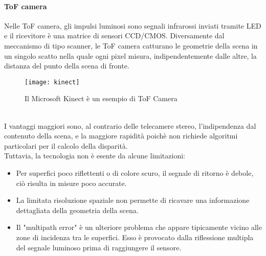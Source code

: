 \paragraph{ToF camera}
Nelle ToF camera, gli impulsi luminosi sono segnali infrarossi inviati tramite LED e il ricevitore è una matrice di sensori CCD/CMOS. Diversamente dal meccanismo di tipo scanner, le ToF camera catturano le geometrie della scena in un singolo scatto nella quale ogni pixel misura, indipendentemente dalle altre, la distanza del punto della scena di fronte.
\begin{figure}[ht]
    \centering
    \texttt{[image: kinect]}
    \caption[Microsoft kinect]{Il Microsoft Kinect è un esempio di ToF Camera}
    \label{zed}
\end{figure}\\
I vantaggi maggiori sono, al contrario delle telecamere stereo, l'indipendenza dal contenuto della scena, e la maggiore rapidità poichè non richiede algoritmi particolari per il calcolo della disparità. \\
Tuttavia, la tecnologia non è esente da alcune limitazioni: 
\begin{itemize}
    \item Per superfici poco riflettenti o di colore scuro, il segnale di ritorno è debole, ciò risulta in misure poco accurate. 
    \item La limitata risoluzione spaziale non permette di ricavare una informazione dettagliata della geometria della scena.
    \item Il "multipath error" è un ulteriore problema che appare tipicamente vicino alle zone di incidenza tra le superfici. Esso è provocato dalla riflessione multipla del segnale luminoso prima di raggiungere il sensore. 
\end{itemize}


